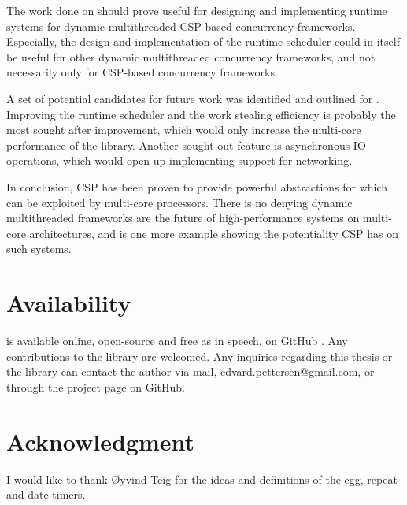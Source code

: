 The work done on \Proxc{} should prove useful for designing and implementing runtime systems for dynamic multithreaded CSP\hyp{}based concurrency frameworks. Especially, the design and implementation of the runtime scheduler could in itself be useful for other dynamic multithreaded concurrency frameworks, and not necessarily only for CSP\hyp{}based concurrency frameworks.

A set of potential candidates for future work was identified and outlined for \Proxc{}. Improving the runtime scheduler and the work stealing efficiency is probably the most sought after improvement, which would only increase the multi\hyp{}core performance of the library. Another sought out feature is asynchronous IO operations, which would open up implementing support for networking.

In conclusion, CSP has been proven to provide powerful abstractions for which can be exploited by multi\hyp{}core processors. There is no denying dynamic multithreaded frameworks are the future of high\hyp{}performance systems on multi\hyp{}core architectures, and \Proxc{} is one more example showing the potentiality CSP has on such systems.


\section{Availability}


\Proxc{} is available online, open\hyp{}source and free as in speech, on GitHub \citep{pettersen2017proxcgithub}. Any contributions to the library are welcomed. Any inquiries regarding this thesis or the library can contact the author via mail, \href{mailto:edvard.pettersen@gmail.com}{edvard.pettersen@gmail.com}, or through the project page on GitHub.


\section{Acknowledgment}


I would like to thank Øyvind Teig for the ideas and definitions of the egg, repeat and date timers.

